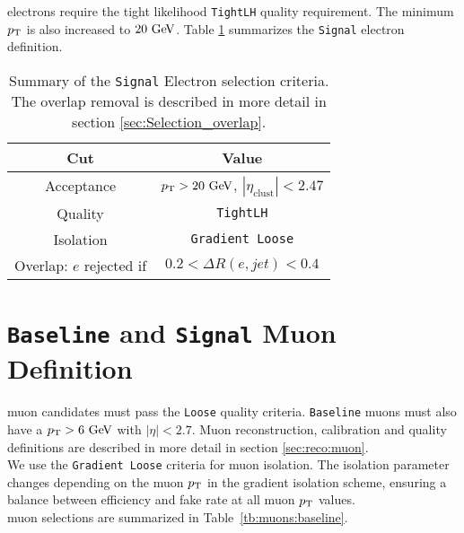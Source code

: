  electrons require the tight likelihood {\tt TightLH} quality requirement.  The minimum $p_{\mathrm{T}}$ is also increased to $20 \gev$.  Table \ref{tb:electrons} summarizes the {\tt Signal} electron definition. \\

\begin{table}[h!]
  \caption{Summary of the {\tt Signal} Electron selection criteria. The overlap removal is described in more detail in section \ref{sec:Selection_overlap}.}
  \label{tb:electrons}
    \begin{center}
    \begin{tabular}{c|c} \hline \hline
      Cut & Value \\ \hline \hline
      Acceptance & $\pT > 20 \gev$, $|\eta_{\mathrm{clust}}| < 2.47$ \\ \hline
      Quality & {\tt TightLH} \\ \hline
      Isolation & {\tt Gradient Loose} \\ \hline
      Overlap: $e$ rejected if &  $0.2 < \Delta R(e,jet) < 0.4$\\ \hline%
      \hline
    \end{tabular}
  \end{center}
\end{table}%

\section{{\tt Baseline} and {\tt Signal} Muon Definition}  \label{sec:MuonDef}

 muon candidates must pass the {\tt Loose} quality criteria.  {\tt Baseline} muons must also have a $\pT > 6 \gev$ with $|\eta| < 2.7$.  Muon reconstruction, calibration and quality definitions are described in more detail in section \ref{sec:reco:muon}. \\

\indent We use the {\tt Gradient Loose} criteria for muon isolation. The isolation parameter changes depending on the muon $p_{\mathrm{T}}$ in the gradient isolation scheme, ensuring a balance between efficiency and fake rate at all muon $p_{\mathrm{T}}$ values. \\

 muon selections are summarized in Table~\ref{tb:muons:baseline}. \\  

